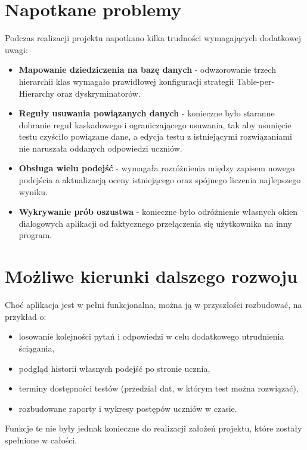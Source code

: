 \section{Napotkane problemy}
\label{sec:problemy}

Podczas realizacji projektu napotkano kilka trudności wymagających dodatkowej uwagi:

\begin{itemize}
  \item \textbf{Mapowanie dziedziczenia na bazę danych} - odwzorowanie trzech hierarchii klas
        wymagało prawidłowej konfiguracji strategii Table-per-Hierarchy oraz dyskryminatorów.
  \item \textbf{Reguły usuwania powiązanych danych} - konieczne było staranne dobranie reguł
        kaskadowego i ograniczającego usuwania, tak aby usunięcie testu czyściło powiązane dane,
        a edycja testu z istniejącymi rozwiązaniami nie naruszała oddanych odpowiedzi uczniów.
  \item \textbf{Obsługa wielu podejść} - wymagała rozróżnienia między zapisem nowego podejścia
        a aktualizacją oceny istniejącego oraz spójnego liczenia najlepszego wyniku.
  \item \textbf{Wykrywanie prób oszustwa} - konieczne było odróżnienie własnych okien dialogowych
        aplikacji od faktycznego przełączenia się użytkownika na inny program.
\end{itemize}

\section{Możliwe kierunki dalszego rozwoju}
\label{sec:dalszyRozwoj}

Choć aplikacja jest w pełni funkcjonalna, można ją w przyszłości rozbudować, na przykład o:

\begin{itemize}
  \item losowanie kolejności pytań i odpowiedzi w celu dodatkowego utrudnienia ściągania,
  \item podgląd historii własnych podejść po stronie ucznia,
  \item terminy dostępności testów (przedział dat, w którym test można rozwiązać),
  \item rozbudowane raporty i wykresy postępów uczniów w czasie.
\end{itemize}

Funkcje te nie były jednak konieczne do realizacji założeń projektu, które zostały spełnione
w całości.
